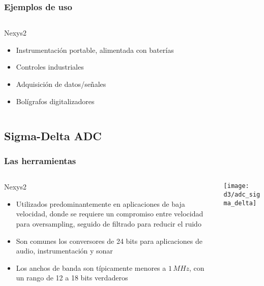\documentclass{beamer}
\begin{document}
\begin{frame}
\frametitle{Ejemplos de uso}
  \begin{columns}
    \begin{column}{0.45\textwidth}
      \begin{block}{Nexys2}
        \begin{itemize}
          \item  Instrumentación portable, alimentada con baterías
          \item  Controles industriales
          \item  Adquisición de datos/señales
          \item  Bolígrafos digitalizadores 
        \end{itemize}
      \end{block}
    \end{column} 
  \end{columns}
\end{frame}

\subsection{Sigma-Delta ADC}

\begin{frame}
\frametitle{Las herramientas}
  \begin{columns}
    \begin{column}{0.45\textwidth}
      \begin{block}{Nexys2}
        \begin{itemize}
          \item  Utilizados predominantemente en aplicaciones de baja velocidad,
donde se requiere un compromiso entre velocidad para oversampling, seguido de
filtrado para reducir el ruido
          \item  Son comunes los conversores de 24 bits para aplicaciones de
audio, instrumentación y sonar
          \item  Los anchos de banda son típicamente menores a $1\,MHz$, con un
rango de 12 a 18 bits verdaderos
        \end{itemize}
      \end{block}
    \end{column} 
    \begin{column}{0.65\textwidth}
      \texttt{[image: d3/adc\_sigma\_delta]}
    \end{column}
  \end{columns}
\end{frame}
\end{document}
